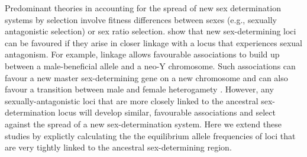 \documentclass[12pt]{article}
\begin{document}


Predominant theories in accounting for the spread of new sex determination systems by selection involve fitness differences between sexes (e.g., sexually antagonistic selection) or sex ratio selection. 
\citet{vanDoorn:2007eu,vanDoorn:2010hu} show that new sex-determining loci can be favoured if they arise in closer linkage with a locus that experiences sexual antagonism. 
For example, linkage allows favourable associations to build up between a male-beneficial allele and a neo-Y chromosome. 
Such associations can favour a new master sex-determining gene on a new chromosome \citep{vanDoorn:2007eu} and can also favour a transition between male and female heterogamety \citep[e.g., a ZW to XY transition,][]{vanDoorn:2010hu}. 
However, any sexually-antagonistic loci that are more closely linked to the ancestral sex-determination locus will develop similar, favourable associations and select against the spread of a new sex-determination system. 
Here we extend these studies by explictly calculating the the equilibrium allele frequencies of loci that are very tightly linked to the ancestral sex-determining region. 
\end{document}
